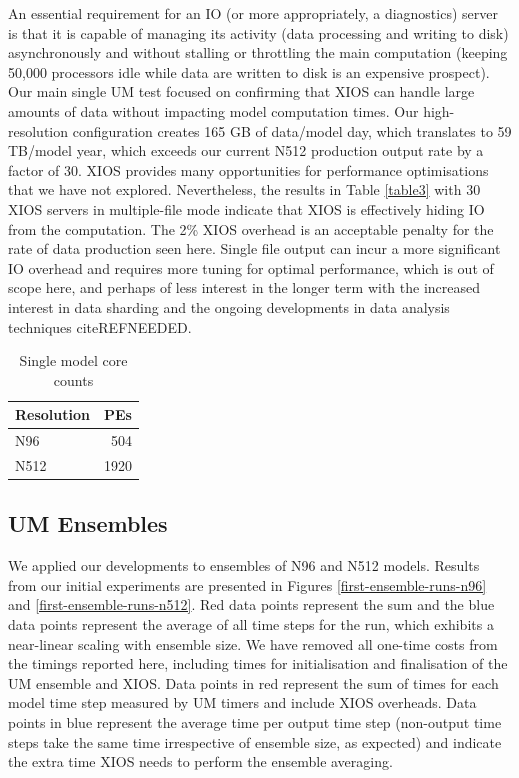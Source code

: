 \documentclass[twocolumn, 12pt]{paper}
\begin{document}
An essential requirement for an IO (or more appropriately, a diagnostics) server is that it is capable of managing its activity (data processing and writing to disk) asynchronously and without stalling or throttling the main computation (keeping 50,000 processors idle while data are written to disk is an expensive prospect).
Our main single UM test focused on confirming that XIOS can handle large amounts of data without impacting model computation times.
Our high-resolution configuration creates 165 GB of data/model day, which translates to 59 TB/model year, which exceeds our current N512 production output rate by a factor of 30.
XIOS provides many opportunities for performance optimisations that we have not explored.
Nevertheless, the results in Table \ref{table3} with 30 XIOS servers in multiple-file mode indicate that XIOS is effectively hiding IO from the computation.
The 2\% XIOS overhead is an acceptable penalty for the rate of data production seen here.
Single file output can incur a more significant IO overhead and requires more tuning for optimal performance, which is out of scope here, and perhaps of less interest in the longer term with the increased interest in data sharding and the ongoing developments in data analysis techniques cite{REFNEEDED}.

\begin{table}[H]
	\begin{center}
	\begin{tabular}{|l|r|}
		\hline
		Resolution & \multicolumn{1}{c|}{PEs} \\
		\hline
		N96  & 504	\\
		N512 & 1920 \\
		\hline
	\end{tabular}
	\caption{Single model core counts}
  \label{table1}
	\end{center}
\end{table}


\subsection{UM Ensembles}

We applied our developments to ensembles of N96 and N512 models.
Results from our initial experiments are presented in Figures \ref{first-ensemble-runs-n96} and \ref{first-ensemble-runs-n512}.
Red data points represent the sum and the blue data points represent the average of all time steps for the run, which exhibits a near-linear scaling with ensemble size.
We have removed all one-time costs from the timings reported here, including times for initialisation and finalisation of the UM ensemble and XIOS.
Data points in red represent the sum of times for each model time step measured by UM timers and include XIOS overheads.
Data points in blue represent the average time per output time step (non-output time steps take the same time irrespective of ensemble size, as expected) and indicate the extra time XIOS needs to perform the ensemble averaging.
\end{document}
